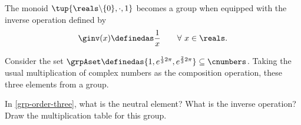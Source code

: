 \begin{example}
The monoid $\tup{\reals \backslash \{ 0 \}, \cdot, 1}$ becomes a group when equipped with the inverse operation defined by
\begin{equation}
\ginv(x) \definedas \frac{1}{x} \quad \quad \forall \ x \in \reals.
\end{equation}
\end{example}

\begin{example}\label{grp-order-three}
Consider the set $\grpAset \definedas \{ 1, e^{\frac{1}{3} 2 \pi}, e^{\frac{2 }{3} 2 \pi}  \} \subseteq \cnumbers$. Taking the usual multiplication of complex numbers as the composition operation, these three elements from a group. 
\end{example}

\begin{exercise}
In \cref{grp-order-three}, what is the neutral element? What is the inverse operation? 
Draw the multiplication table for this group. 
\end{exercise}



